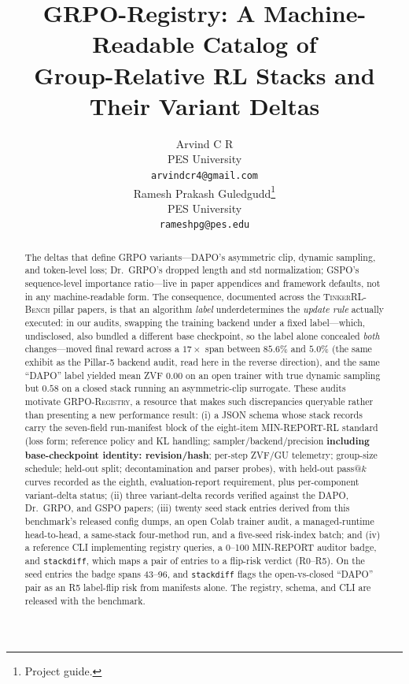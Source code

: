 \documentclass{article}
\title{GRPO-Registry: A Machine-Readable Catalog of\\
       Group-Relative RL Stacks and Their Variant Deltas}
\author{
  Arvind C R \\
  PES University\\
  \texttt{arvindcr4@gmail.com} \\
  \And
  Ramesh Prakash Guledgudd\thanks{Project guide.} \\
  PES University\\
  \texttt{rameshpg@pes.edu} \\
}
\newcommand{\ours}{\textsc{TinkerRL-Bench}}
\begin{document}
\sloppy {}  \hfuzz=2pt
\maketitle
\begin{abstract}
The deltas that define GRPO variants---DAPO's asymmetric clip, dynamic sampling,
and token-level loss; Dr.~GRPO's dropped length and std normalization; GSPO's
sequence-level importance ratio---live in paper appendices and framework
defaults, not in any machine-readable form. The consequence, documented across
the \ours{} pillar papers, is that an algorithm \emph{label} underdetermines the
\emph{update rule} actually executed: in our audits, swapping the training backend
under a fixed label---which, undisclosed, also bundled a different base checkpoint,
so the label alone concealed \emph{both} changes---moved final reward across a
$17\times$ span between $85.6\%$ and $5.0\%$ (the same exhibit as the Pillar-5
backend audit, read here in the reverse direction),
and the same ``DAPO'' label yielded mean ZVF $0.00$ on an open trainer with true
dynamic sampling but $0.58$ on a closed stack running an asymmetric-clip
surrogate. These audits motivate \textsc{GRPO-Registry}, a resource that makes
such discrepancies queryable rather than presenting a new performance result:
(i) a JSON schema whose stack records carry the seven-field run-manifest block
of the eight-item MIN-REPORT-RL standard (loss form; reference policy and KL handling;
sampler/backend/precision \textbf{including base-checkpoint identity: revision/hash};
per-step ZVF/GU telemetry; group-size schedule;
held-out split; decontamination and parser probes), with held-out pass@$k$
curves recorded as the eighth, evaluation-report requirement, plus per-component
variant-delta status; (ii) three variant-delta records verified against the
DAPO, Dr.~GRPO, and GSPO papers; (iii) twenty seed stack entries derived from
this benchmark's released config dumps, an open Colab trainer audit, a
managed-runtime head-to-head, a same-stack four-method run, and a five-seed
risk-index batch; and (iv) a reference CLI implementing registry
queries, a 0--100 MIN-REPORT auditor badge, and \texttt{stackdiff}, which maps a
pair of entries to a flip-risk verdict (R0--R5). On the seed entries the badge
spans 43--96, and \texttt{stackdiff} flags the open-vs-closed ``DAPO'' pair as
an R5 label-flip risk from manifests alone. The registry, schema, and CLI are
released with the benchmark.

\end{abstract}
\end{document}
